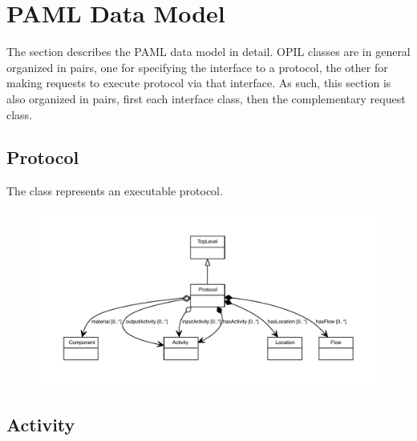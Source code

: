 
\section{PAML Data Model}\label{sec:model}

The section describes the PAML data model in detail.  
OPIL classes are in general organized in pairs, one for specifying the interface to a protocol, the other for making requests to execute protocol via that interface.
As such, this section is also organized in pairs, first each interface class, then the complementary request class.

\subsection{Protocol}
\label{sec:Protocol}

The  class represents an executable protocol.

\begin{figure}[ht]
\begin{center}
\includegraphics[scale=0.8]{uml/Protocol_abstraction_hierarchy.pdf}
\end{center}
\end{figure}

\subsection{Activity}
\label{sec:Activity}


